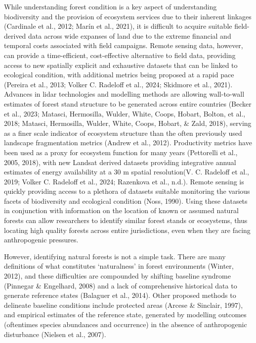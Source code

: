 \documentclass[
]{agujournal2019}
\begin{document}
While understanding forest condition is a key aspect of understanding
biodiversity and the provision of ecosystem services due to their
inherent linkages (Cardinale et al., 2012; Marín et al., 2021), it is
difficult to acquire suitable field-derived data across wide expanses of
land due to the extreme financial and temporal costs associated with
field campaigns. Remote sensing data, however, can provide a
time-efficient, cost-effective alternative to field data, providing
access to new spatially explicit and exhaustive datasets that can be
linked to ecological condition, with additional metrics being proposed
at a rapid pace (Pereira et al., 2013; Volker C. Radeloff et al., 2024;
Skidmore et al., 2021). Advances in lidar technologies and modelling
methods are allowing wall-to-wall estimates of forest stand structure to
be generated across entire countries (Becker et al., 2023; Matasci,
Hermosilla, Wulder, White, Coops, Hobart, Bolton, et al., 2018; Matasci,
Hermosilla, Wulder, White, Coops, Hobart, \& Zald, 2018), serving as a
finer scale indicator of ecosystem structure than the often previously
used landscape fragmentation metrics (Andrew et al., 2012). Productivity
metrics have been used as a proxy for ecosystem function for many years
(Pettorelli et al., 2005, 2018), with new Landsat derived datasets
providing integrative annual estimates of energy availability at a 30 m
spatial resolution(V. C. Radeloff et al., 2019; Volker C. Radeloff et
al., 2024; Razenkova et al., n.d.). Remote sensing is quickly providing
access to a plethora of datasets suitable monitoring the various facets
of biodiversity and ecological condition (Noss, 1990). Using these
datasets in conjunction with information on the location of known or
assumed natural forests can allow researchers to identify similar forest
stands or ecosystems, thus locating high quality forests across entire
jurisdictions, even when they are facing anthropogenic pressures.

However, identifying natural forests is not a simple task. There are
many definitions of what constitutes `naturalness' in forest
environments (Winter, 2012), and these difficulties are compounded by
shifting baseline syndrome (Pinnegar \& Engelhard, 2008) and a lack of
comprehensive historical data to generate reference states (Balaguer et
al., 2014). Other proposed methods to delineate baseline conditions
include protected areas (Arcese \& Sinclair, 1997), and empirical
estimates of the reference state, generated by modelling outcomes
(oftentimes species abundances and occurrence) in the absence of
anthropogenic disturbance (Nielsen et al., 2007).
\end{document}
